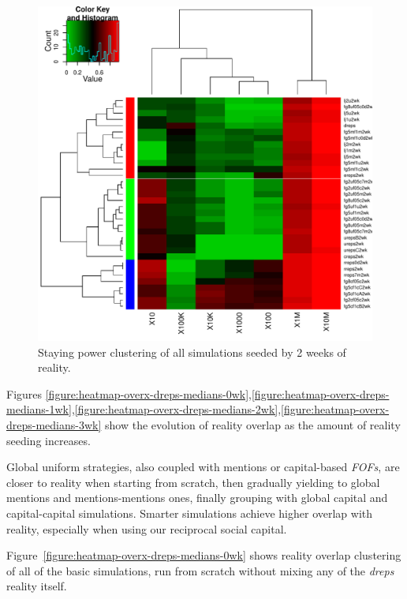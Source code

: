 \documentclass[10pt,oneside]{memoir}
\begin{document}
\begin{figure}
\begin{center}
    \includegraphics{figures/heatmap-srates-medians-2wk}
    \caption{Staying power clustering of all simulations seeded by 2 weeks of reality.}
    \label{figure:heatmap-srates-medians-2wk}
\end{center}
\end{figure}
Figures \ref{figure:heatmap-overx-dreps-medians-0wk},\ref{figure:heatmap-overx-dreps-medians-1wk},\ref{figure:heatmap-overx-dreps-medians-2wk},\ref{figure:heatmap-overx-dreps-medians-3wk} show the evolution of reality overlap as the amount of reality seeding increases.  


Global uniform strategies, also coupled with mentions or capital-based {\itshape FOFs}, are closer to reality when starting from scratch, then gradually yielding to global mentions and mentions-mentions ones, finally grouping with global capital and capital-capital simulations.  Smarter simulations achieve higher overlap with reality, especially when using our reciprocal social capital.


Figure~\ref{figure:heatmap-overx-dreps-medians-0wk} shows reality overlap clustering of all of the basic simulations, run from scratch without mixing any of the {\itshape dreps} reality itself.
\end{document}
